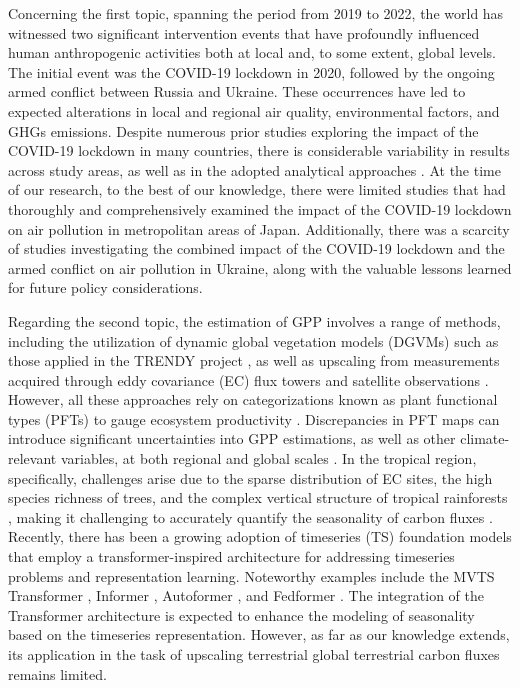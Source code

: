 Concerning the first topic, spanning the period from 2019 to 2022, the world has witnessed two significant intervention events that have profoundly influenced human anthropogenic activities both at local and, to some extent, global levels. The initial event was the COVID-19 lockdown in 2020, followed by the ongoing armed conflict between Russia and Ukraine. These occurrences have led to expected alterations in local and regional air quality, environmental factors, and GHGs emissions. Despite numerous prior studies exploring the impact of the COVID-19 lockdown in many countries, there is considerable variability in results across study areas, as well as in the adopted analytical approaches \citep{shi2021abrupt, grange2021covid}. At the time of our research, to the best of our knowledge, there were limited studies that had thoroughly and comprehensively examined the impact of the COVID-19 lockdown on air pollution in metropolitan areas of Japan. Additionally, there was a scarcity of studies investigating the combined impact of the COVID-19 lockdown and the armed conflict on air pollution in Ukraine, along with the valuable lessons learned for future policy considerations.\par

Regarding the second topic, the estimation of GPP involves a range of methods, including the utilization of dynamic global vegetation models (DGVMs) such as those applied in the TRENDY project \citep{sitch2015recent, le2018global}, as well as upscaling from measurements acquired through eddy covariance (EC) flux towers and satellite observations \citep{jung2019fluxcom, zeng2020global}. However, all these approaches rely on categorizations known as plant functional types (PFTs) to gauge ecosystem productivity \citep{poulter2011plant, poulter2015plant, lin2021improved, guo2023estimating, yan2023integrating}. Discrepancies in PFT maps can introduce significant uncertainties into GPP estimations, as well as other climate-relevant variables, at both regional and global scales \citep{poulter2011plant}. In the tropical region, specifically, challenges arise due to the sparse distribution of EC sites, the high species richness of trees, and the complex vertical structure of tropical rainforests \citep{montgomery2001forest}, making it challenging to accurately quantify the seasonality of carbon fluxes \citep{xu2015satellite}. Recently, there has been a growing adoption of timeseries (TS) foundation models that employ a transformer-inspired architecture for addressing timeseries problems and representation learning. Noteworthy examples include the MVTS Transformer \citep{zerveas2021transformer}, Informer \citep{zhou2021informer}, Autoformer \citep{wu2021autoformer}, and Fedformer \citep{zhou2022fedformer}. The integration of the Transformer architecture is expected to enhance the modeling of seasonality based on the timeseries representation. However, as far as our knowledge extends, its application in the task of upscaling terrestrial global terrestrial carbon fluxes remains limited. \par

